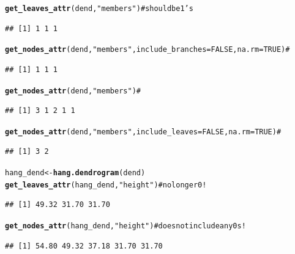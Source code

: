 \documentclass[shortnames,nojss,article]{jss}\usepackage{graphicx, color}
\makeatletter
\newcommand{\hlfunctioncall}[1]{\textcolor[rgb]{0.501960784313725,0,0.329411764705882}{\textbf{#1}}}%
\newcommand{\hlstring}[1]{\textcolor[rgb]{0.6,0.6,1}{#1}}%
\newenvironment{kframe}{%
 \def\at@end@of@kframe{}%
 \ifinner\ifhmode%
  \def\at@end@of@kframe{\end{minipage}}%
  \begin{minipage}{\columnwidth}%
 \fi\fi%
 \def\FrameCommand##1{\hskip\@totalleftmargin \hskip-\fboxsep
 \colorbox{shadecolor}{##1}\hskip-\fboxsep
     \hskip-\linewidth \hskip-\@totalleftmargin \hskip\columnwidth}%
 \MakeFramed {\advance\hsize-\width
   \@totalleftmargin\z@ \linewidth\hsize
   \@setminipage}}%
 {\par\unskip\endMakeFramed%
 \at@end@of@kframe}
\newenvironment{knitrout}{}{} %
\makeatother
\begin{document}
\begin{knitrout}
\begin{kframe}
\begin{alltt}
\hlfunctioncall{get_leaves_attr}(dend, \hlstring{"members"})  # should be 1's
\end{alltt}
\begin{verbatim}
## [1] 1 1 1
\end{verbatim}
\begin{alltt}
\hlfunctioncall{get_nodes_attr}(dend, \hlstring{"members"}, include_branches = FALSE, na.rm = TRUE)  #
\end{alltt}
\begin{verbatim}
## [1] 1 1 1
\end{verbatim}
\begin{alltt}
\hlfunctioncall{get_nodes_attr}(dend, \hlstring{"members"})  #
\end{alltt}
\begin{verbatim}
## [1] 3 1 2 1 1
\end{verbatim}
\begin{alltt}
\hlfunctioncall{get_nodes_attr}(dend, \hlstring{"members"}, include_leaves = FALSE, na.rm = TRUE)  #
\end{alltt}
\begin{verbatim}
## [1] 3 2
\end{verbatim}
\begin{alltt}


hang_dend <- \hlfunctioncall{hang.dendrogram}(dend)
\hlfunctioncall{get_leaves_attr}(hang_dend, \hlstring{"height"})  # no longer 0!
\end{alltt}
\begin{verbatim}
## [1] 49.32 31.70 31.70
\end{verbatim}
\begin{alltt}
\hlfunctioncall{get_nodes_attr}(hang_dend, \hlstring{"height"})  # does not include any 0s!
\end{alltt}
\begin{verbatim}
## [1] 54.80 49.32 37.18 31.70 31.70
\end{verbatim}
\begin{alltt}


\end{alltt}
\end{kframe}
\end{knitrout}
\end{document}
